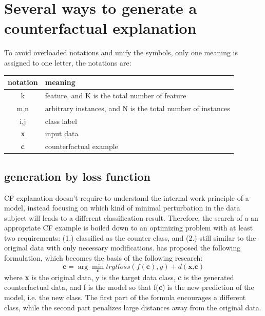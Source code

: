 \section{Several ways to generate a counterfactual explanation}
To avoid overloaded notations and unify the symbols, only one meaning is assigned to one letter, the notations are:

{\centering
\begin{tabular}{|c|l|}
\hline
   notation&meaning\\
  \hline
  k & feature, and K is the total number of feature \\
  m,n & arbitrary instances, and N is the total number of instances \\
  i,j & class label\\
  \hline
  \textbf{x} & input data\\
  \textbf{c} & counterfactual example\\
  \hline
\end{tabular}}
\subsection{generation by loss function}\label{sec:lossFunc}
CF explanation doesn't require to understand the internal work principle of a model, instead focusing on which kind of minimal perturbation in the data subject will leads to a different classification result. Therefore, the search of a an appropriate CF example is boiled down to an optimizing problem with at least two requirements: (1.) classified as the counter class, and (2.) still similar to the original data with only necessary modifications. \cite{watcher2017} has proposed the following formulation, which becomes the basis of the following research:
\begin{equation}\label{eq:watcher}
  \textbf{c}=\arg\min_{\textbf{c}}trgtloss(f(\textbf{c}),y)+d(\textbf{x,c})
\end{equation}
where \textbf{x} is the original data, y is the target data class, \textbf{c} is the generated counterfactual data, and f is the model so that f(\textbf{c}) is the new prediction of the model, i.e. the new class. The first part of the formula encourages a different class, while the second part penalizes large distances away from the original data.

